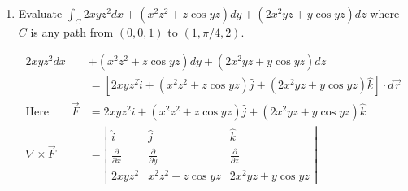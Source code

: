\begin{enumerate}
\begin{answer}
\begin{align}
		\text{So}\qquad d \phi&=\left(2 x y^{3}-y^{2} \cos x\right) d x+\left(1-2 y \sin x+3 x^{2} y^{2}\right) d y\notag\\
		\Rightarrow \quad \frac{\partial \phi}{\partial x} d x+\frac{\partial \phi}{\partial y} d y&=\left(2 x y^{3}-y^{2} \cos x\right) d x+\left(1-2 y \sin x+3 x^{2} y^{2}\right) d y\notag\\
		\frac{\partial \phi}{\partial x}&=2 x y^{3}-y^{2} \cos x\notag\\
		\Rightarrow
		\phi&=\int_{y=\text { constant }}\left(2 x y^{3}-y^{2} \cos x\right) d x=x^{2} y^{3}-y^{2} \sin x\label{VI-01}\\
		\frac{\partial \phi}{\partial y}&=1-2 y \sin x+3 x^{2} y^{2}\notag\\
		\Rightarrow
		\phi&=\int_{x=\text { constant }}\left(1-2 y \sin x+3 x^{2} y^{2}\right) d y=y-y^{2} \sin x+x^{2} y^{3}\label{VI-02}
		\intertext{Adding (\ref{VI-01}) \& (\ref{VI-02}) while writing the common term once}
		\phi&=y-y^{2} \sin x-x^{2} y^{3}\notag
		\intertext{So, given integral}
		 \int_{C} M d x+N d y &=\int d \phi=\phi \notag\\ &=\left[y-y^{2} \sin x-x^{2} y^{3}\right]_{(0,0)}^{(\pi / 2,1)}=\frac{\pi^{2}}{4} \notag
		\end{align}
	\end{answer}
	\item Evaluate $\int_{C} 2 x y z^{2} d x+\left(x^{2} z^{2}+z \cos y z\right) d y+\left(2 x^{2} y z+y \cos y z\right) d z$ where $C$ is any path from $(0,0,1)$ to $(1, \pi / 4,2)$.
	\begin{answer}
		\begin{align*}
		2 x y z^{2} d x&+\left(x^{2} z^{2}+z \cos y z\right) d y+\left(2 x^{2} y z+y \cos y z\right) d z\\
		 &=\left[2 x y z^{2} \hat{i}+\left(x^{2} z^{2}+z \cos y z\right) \hat{j}+\left(2 x^{2} y z+y \cos y z\right) \hat{k}\right] \cdot d \vec{r} \\ \text{Here}\qquad \vec{F} &=2 x y z^{2} \hat{i}+\left(x^{2} z^{2}+z \cos y z\right) \hat{j}+\left(2 x^{2} y z+y \cos y z\right) \hat{k} \\
		 \nabla \times \vec{F}&=\left|\begin{array}{ccc}\hat{i} & \hat{j} & \hat{k} \\ \frac{\partial}{\partial x} & \frac{\partial}{\partial y} & \frac{\partial}{\partial z} \\ 2 x y z^{2} & x^{2} z^{2}+z \cos y z & 2 x^{2} y z+y \cos y z\end{array}\right|\\

\end{align*}
\end{answer}
\end{enumerate}
